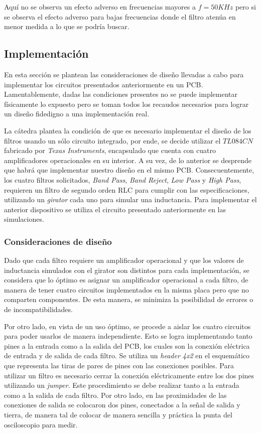 Aquí no se observa un efecto adverso en frecuencias mayores a $f=50KHz$ pero si se observa el efecto adverso para bajas frecuencias donde el filtro
atenúa en menor medida a lo que se podría buscar.


\subsection{Implementación}


En esta sección se plantean las consideraciones de diseño llevadas a cabo para implementar los circuitos presentados anteriormente 
en un PCB. Lamentablemente, dadas las condiciones presentes no se puede implementar físicamente lo expuesto pero se toman todos los 
recaudos necesarios para lograr un diseño fidedigno a una implementación real. \par 

La cátedra plantea la condición de que es necesario implementar el diseño de los filtros usando un sólo circuito integrado, por ende, se 
decide utilizar el $TL084CN$ fabricado por \textit{Texas Instruments},
 encapsulado que cuenta con cuatro amplificadores operacionales en su interior. A su vez, de lo anterior se desprende que habrá que implementar 
 nuestro diseño en el mismo PCB.
Consecuentemente, los cuatro filtros solicitados, \textit{Band Pass}, \textit{Band Reject}, \textit{Low Pass} y \textit{High Pass}, requieren un 
filtro de segundo orden RLC para cumplir con las especificaciones, utilizando un \textit{girator} cada uno para simular una inductancia. Para 
implementar el anterior dispositivo se utiliza el circuito presentado anteriormente en las simulaciones. \par 

\subsubsection{Consideraciones de diseño}
Dado que cada filtro requiere un amplificador operacional y que los valores de inductancia simulados con el girator son distintos para cada implementación,
se considera que lo óptimo es asignar un amplificador operacional a cada filtro, de manera de tener cuatro circuitos implementados en
 la misma placa pero que no comparten 
componentes. De esta manera, se minimiza la posibilidad de errores o de incompatibilidades. \par 

Por otro lado, en vista de un uso óptimo, se procede a aislar los cuatro circuitos para poder usarlos de manera independiente. Esto se logra implementando 
tanto pines a la entrada como a la salida del PCB, los cuales son la conexión eléctrica de entrada y de salida de cada filtro. Se utiliza un 
\textit{header 4x2} en el esquemático que representa las tiras de pares de pines con las conexiones posibles. Para utilizar un filtro es necesario cerrar
 la conexión eléctricamente entre los dos pines utilizando un \textit{jumper}. Este procedimiento se debe realizar tanto a la entrada como a la salida de 
 cada filtro.  Por otro lado, en las proximidades de las conexiones de salida se colocaron dos pines, conectados a la señal de salida y tierra,
  de manera tal de colocar de manera sencilla y práctica la punta del osciloscopio para medir.

